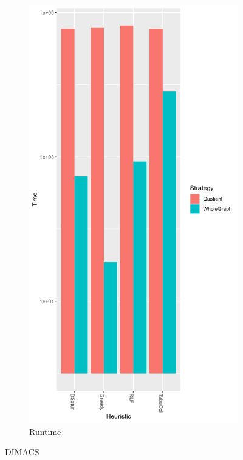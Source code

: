\documentclass[a4paper]{article}
\begin{document}
\begin{figure}[p]
\begin{subfigure}{.4\paperwidth}
    \end{subfigure}%
    \begin{subfigure}{.4\paperwidth}
        \includegraphics[width=\columnwidth]{Tables/DIMACSTime.png}
      \caption{Runtime}
      \label{fig:dimacst}
    \end{subfigure}
\caption{DIMACS}
\label{fig:dimacs}
\end{figure}
\end{document}
